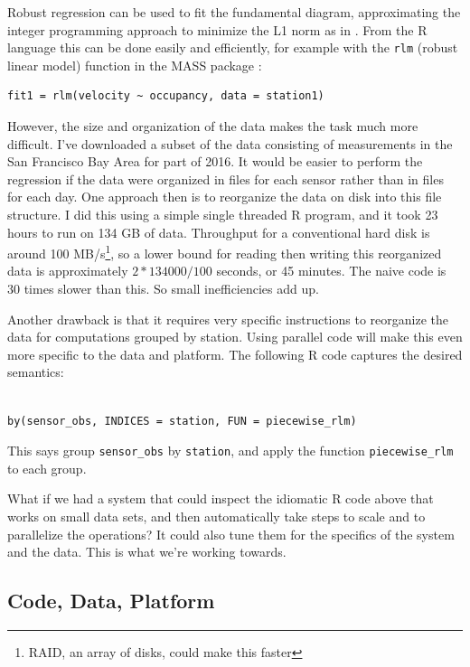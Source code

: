\documentclass[12pt]{article}
\begin{document}
Robust regression can be used to fit the fundamental diagram, approximating
the integer programming approach to minimize the L1 norm as in
\cite{li2011fundamental}.  From the R language this can be done easily and
efficiently, for example with the \texttt{rlm} (robust linear model)
function in the MASS package \cite{venables2013modern}:

\begin{verbatim}
fit1 = rlm(velocity ~ occupancy, data = station1)
\end{verbatim}

However, the size and organization of the data makes the task much more
difficult.  I've downloaded a subset of the data consisting of measurements
in the San Francisco Bay Area for part of 2016.  It would be easier to
perform the regression if the data were organized in files for each sensor
rather than in files for each day.  One approach then is to reorganize the
data on disk into this file structure. I did this using a simple single
threaded R program, and it took 23 hours to run on 134 GB of data.
Throughput for a conventional hard disk is around 100 MB/s\footnote{RAID,
an array of disks, could make this faster}, so a lower bound for reading
then writing this reorganized data is approximately $2 * 134000 / 100$
seconds, or 45 minutes. The naive code is 30 times slower than this. So
small inefficiencies add up.

Another drawback is that it requires
very specific instructions to reorganize the data for computations grouped
by station. Using parallel code will make this even more specific to the
data and platform. The following R code captures the desired semantics:

\begin{verbatim}

by(sensor_obs, INDICES = station, FUN = piecewise_rlm)

\end{verbatim}

This says group \texttt{sensor\_obs} by \texttt{station}, and apply the
function \texttt{piecewise\_rlm} to each group.

What if we had a system that could inspect the idiomatic R code above that
works on small data sets, and then automatically take steps to scale and to
parallelize the operations? It could also tune them for the specifics of
the system and the data. This is what we're working towards.

\subsection{Code, Data, Platform}
\end{document}
